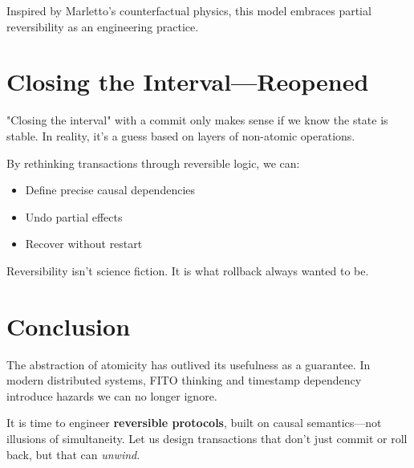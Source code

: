 Inspired by Marletto's counterfactual physics, this model embraces partial reversibility as an engineering practice.

\section{Closing the Interval—Reopened}
"Closing the interval" with a commit only makes sense if we know the state is stable. In reality, it's a guess based on layers of non-atomic operations.

By rethinking transactions through reversible logic, we can:
\begin{itemize}
  \item Define precise causal dependencies
  \item Undo partial effects
  \item Recover without restart
\end{itemize}

Reversibility isn't science fiction. It is what rollback always wanted to be.

\section{Conclusion}
The abstraction of atomicity has outlived its usefulness as a guarantee. In modern distributed systems, FITO thinking and timestamp dependency introduce hazards we can no longer ignore.

It is time to engineer \textbf{reversible protocols}, built on causal semantics—not illusions of simultaneity. Let us design transactions that don't just commit or roll back, but that can \emph{unwind}.

